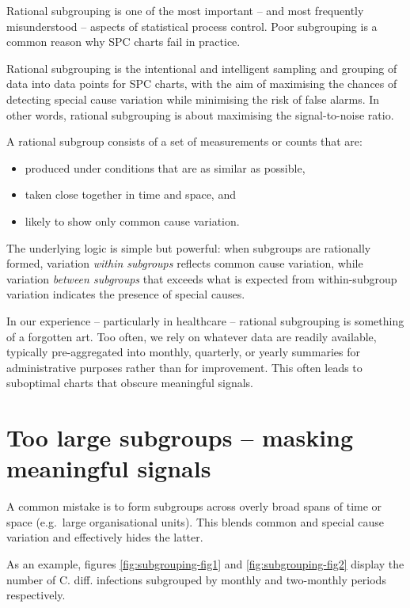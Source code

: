 \documentclass[
]{book}
\providecommand{\tightlist}{%
  \setlength{\itemsep}{0pt}\setlength{\parskip}{0pt}}
\begin{document}
Rational subgrouping is one of the most important -- and most frequently misunderstood -- aspects of statistical process control. Poor subgrouping is a common reason why SPC charts fail in practice.

Rational subgrouping is the intentional and intelligent sampling and grouping of data into data points for SPC charts, with the aim of maximising the chances of detecting special cause variation while minimising the risk of false alarms. In other words, rational subgrouping is about maximising the signal-to-noise ratio.

A rational subgroup consists of a set of measurements or counts that are:

\begin{itemize}
\tightlist
\item
  produced under conditions that are as similar as possible,
\item
  taken close together in time and space, and
\item
  likely to show only common cause variation.
\end{itemize}

The underlying logic is simple but powerful: when subgroups are rationally formed, variation \emph{within subgroups} reflects common cause variation, while variation \emph{between subgroups} that exceeds what is expected from within-subgroup variation indicates the presence of special causes.

In our experience -- particularly in healthcare -- rational subgrouping is something of a forgotten art. Too often, we rely on whatever data are readily available, typically pre-aggregated into monthly, quarterly, or yearly summaries for administrative purposes rather than for improvement. This often leads to suboptimal charts that obscure meaningful signals.

\section{Too large subgroups -- masking meaningful signals}\label{too-large-subgroups-masking-meaningful-signals}

A common mistake is to form subgroups across overly broad spans of time or space (e.g.~large organisational units). This blends common and special cause variation and effectively hides the latter.

As an example, figures \ref{fig:subgrouping-fig1} and \ref{fig:subgrouping-fig2} display the number of C. diff. infections subgrouped by monthly and two-monthly periods respectively.
\end{document}
